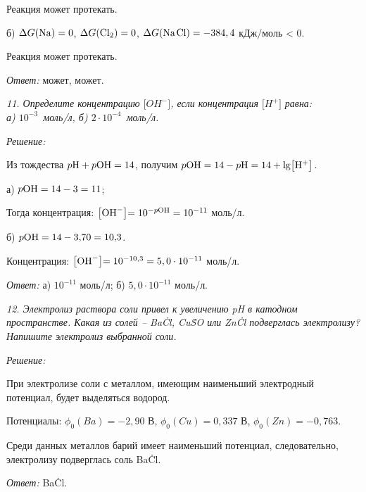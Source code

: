 Реакция может протекать.

б) \( \Delta G(\mathrm{Na}) = 0 \), \( \Delta G(\mathrm{Cl_2}) = 0 \),
\( \Delta G(\mathrm{Na\;\!Cl}) = -384,4 \) кДж/моль < 0.

Реакция может протекать.

\vspace*{2em}
\emph{Ответ:} может, может.

\newpage %

\emph{11. Определите концентрацию \( \bigr[OH^-\bigl] \), если концентрация
\( \bigr[H^+\bigl] \) равна:\\
а) \( 10^{-3} \)~моль/л, б) \( 2\cdot 10^{-4} \)~моль/л.}

\vspace*{2em}
\emph{Решение:}

Из тождества \( p\mathrm{H} + p\mathrm{OH} = 14 \), получим \( p\mathrm{OH} = 14 -
p\mathrm{H} = 14 + \lg\bigr[\mathrm{H^+}\bigl] \).

а) \( p\mathrm{OH} = 14 - 3 = 11 \);

Тогда концентрация: \( \bigr[\mathrm{OH}^-\bigl] = 10^{-p\mathrm{OH}} = 10^{-11} \) моль/л.

б) \( p\mathrm{OH} = 14 - 3,\!70 = 10,\!3 \).

Концентрация: \( \bigr[\mathrm{OH}^-\bigl] = 10^{-10,3} = 5,0 \cdot 10^{-11} \) моль/л.

\vspace*{2em}
\emph{Ответ:} а) \( 10^{-11} \) моль/л; б) \( 5,0 \cdot 10^{-11} \) моль/л.

\newpage %

\emph{12. Электролиз раствора соли привел к увеличению pH в катодном
пространстве. Какая из солей -- Ba\.Cl, Cu\.SO или Zn\.Cl
подверглась электролизу? Напишите электролиз выбранной соли.}

\vspace*{2em}
\emph{Решение:}

При электролизе соли с металлом, имеющим наименьший электродный потенциал,
будет выделяться водород.

Потенциалы: \( \phi_0(Ba) = -2,\!90 \) В, \( \phi_0(Cu) = 0,\!337 \) В,
\( \phi_0(Zn) = -0,763 \).

Среди данных металлов барий имеет наименьший потенциал, следовательно,
электролизу подверглась соль Ba\.Cl.

\vspace*{2em}
\emph{Ответ:} Ba\.Cl.

